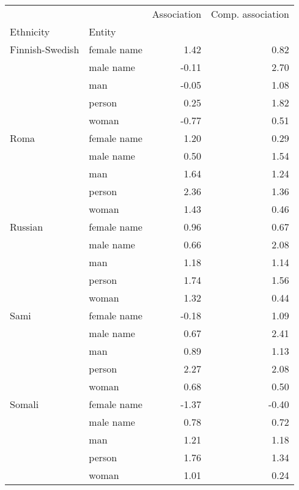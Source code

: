 \begin{tabular}{llrr}
\toprule
       &       &  Association &  Comp. association \\
Ethnicity & Entity &              &                    \\
\midrule
Finnish-Swedish & female name &         1.42 &               0.82 \\
       & male name &        -0.11 &               2.70 \\
       & man &        -0.05 &               1.08 \\
       & person &         0.25 &               1.82 \\
       & woman &        -0.77 &               0.51 \\
Roma & female name &         1.20 &               0.29 \\
       & male name &         0.50 &               1.54 \\
       & man &         1.64 &               1.24 \\
       & person &         2.36 &               1.36 \\
       & woman &         1.43 &               0.46 \\
Russian & female name &         0.96 &               0.67 \\
       & male name &         0.66 &               2.08 \\
       & man &         1.18 &               1.14 \\
       & person &         1.74 &               1.56 \\
       & woman &         1.32 &               0.44 \\
Sami & female name &        -0.18 &               1.09 \\
       & male name &         0.67 &               2.41 \\
       & man &         0.89 &               1.13 \\
       & person &         2.27 &               2.08 \\
       & woman &         0.68 &               0.50 \\
Somali & female name &        -1.37 &              -0.40 \\
       & male name &         0.78 &               0.72 \\
       & man &         1.21 &               1.18 \\
       & person &         1.76 &               1.34 \\
       & woman &         1.01 &               0.24 \\
\bottomrule
\end{tabular}
